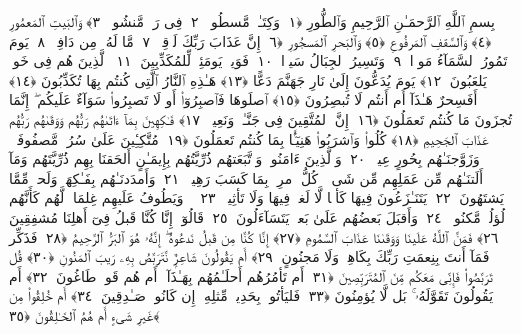 
  
    
  
    
    

\nopagebreak
  بِسمِ ٱللَّهِ ٱلرَّحمَـٰنِ ٱلرَّحِيمِ
  وَٱلطُّورِ ﴿١﴾
 وَكِتَـٰبٍۢ مَّسطُورٍۢ ﴿٢﴾
 فِى رَقٍّۢ مَّنشُورٍۢ ﴿٣﴾
 وَٱلبَيتِ ٱلمَعمُورِ ﴿٤﴾
 وَٱلسَّقفِ ٱلمَرفُوعِ ﴿٥﴾
 وَٱلبَحرِ ٱلمَسجُورِ ﴿٦﴾
 إِنَّ عَذَابَ رَبِّكَ لَوَٟقِعٌۭ ﴿٧﴾
 مَّا لَهُۥ مِن دَافِعٍۢ ﴿٨﴾
 يَومَ تَمُورُ ٱلسَّمَآءُ مَورًۭا ﴿٩﴾
 وَتَسِيرُ ٱلجِبَالُ سَيرًۭا ﴿١٠﴾
 فَوَيلٌۭ يَومَئِذٍۢ لِّلمُكَذِّبِينَ ﴿١١﴾
 ٱلَّذِينَ هُم فِى خَوضٍۢ يَلعَبُونَ ﴿١٢﴾
 يَومَ يُدَعُّونَ إِلَىٰ نَارِ جَهَنَّمَ دَعًّا ﴿١٣﴾
 هَـٰذِهِ ٱلنَّارُ ٱلَّتِى كُنتُم بِهَا تُكَذِّبُونَ ﴿١٤﴾
 أَفَسِحرٌ هَـٰذَآ أَم أَنتُم لَا تُبصِرُونَ ﴿١٥﴾
 ٱصلَوهَا فَٱصبِرُوٓا۟ أَو لَا تَصبِرُوا۟ سَوَآءٌ عَلَيكُم ۖ إِنَّمَا تُجزَونَ مَا كُنتُم تَعمَلُونَ ﴿١٦﴾
 إِنَّ ٱلمُتَّقِينَ فِى جَنَّـٰتٍۢ وَنَعِيمٍۢ ﴿١٧﴾
 فَـٰكِهِينَ بِمَآ ءَاتَىٰهُم رَبُّهُم وَوَقَىٰهُم رَبُّهُم عَذَابَ ٱلجَحِيمِ ﴿١٨﴾
 كُلُوا۟ وَٱشرَبُوا۟ هَنِيٓـًٔۢا بِمَا كُنتُم تَعمَلُونَ ﴿١٩﴾
 مُتَّكِـِٔينَ عَلَىٰ سُرُرٍۢ مَّصفُوفَةٍۢ ۖ وَزَوَّجنَـٰهُم بِحُورٍ عِينٍۢ ﴿٢٠﴾
 وَٱلَّذِينَ ءَامَنُوا۟ وَٱتَّبَعَتهُم ذُرِّيَّتُهُم بِإِيمَـٰنٍ أَلحَقنَا بِهِم ذُرِّيَّتَهُم وَمَآ أَلَتنَـٰهُم مِّن عَمَلِهِم مِّن شَىءٍۢ ۚ كُلُّ ٱمرِئٍۭ بِمَا كَسَبَ رَهِينٌۭ ﴿٢١﴾
 وَأَمدَدنَـٰهُم بِفَـٰكِهَةٍۢ وَلَحمٍۢ مِّمَّا يَشتَهُونَ ﴿٢٢﴾
 يَتَنَـٰزَعُونَ فِيهَا كَأسًۭا لَّا لَغوٌۭ فِيهَا وَلَا تَأثِيمٌۭ ﴿٢٣﴾
 ۞ وَيَطُوفُ عَلَيهِم غِلمَانٌۭ لَّهُم كَأَنَّهُم لُؤلُؤٌۭ مَّكنُونٌۭ ﴿٢٤﴾
 وَأَقبَلَ بَعضُهُم عَلَىٰ بَعضٍۢ يَتَسَآءَلُونَ ﴿٢٥﴾
 قَالُوٓا۟ إِنَّا كُنَّا قَبلُ فِىٓ أَهلِنَا مُشفِقِينَ ﴿٢٦﴾
 فَمَنَّ ٱللَّهُ عَلَينَا وَوَقَىٰنَا عَذَابَ ٱلسَّمُومِ ﴿٢٧﴾
 إِنَّا كُنَّا مِن قَبلُ نَدعُوهُ ۖ إِنَّهُۥ هُوَ ٱلبَرُّ ٱلرَّحِيمُ ﴿٢٨﴾
 فَذَكِّر فَمَآ أَنتَ بِنِعمَتِ رَبِّكَ بِكَاهِنٍۢ وَلَا مَجنُونٍ ﴿٢٩﴾
 أَم يَقُولُونَ شَاعِرٌۭ نَّتَرَبَّصُ بِهِۦ رَيبَ ٱلمَنُونِ ﴿٣٠﴾
 قُل تَرَبَّصُوا۟ فَإِنِّى مَعَكُم مِّنَ ٱلمُتَرَبِّصِينَ ﴿٣١﴾
 أَم تَأمُرُهُم أَحلَـٰمُهُم بِهَـٰذَآ ۚ أَم هُم قَومٌۭ طَاغُونَ ﴿٣٢﴾
 أَم يَقُولُونَ تَقَوَّلَهُۥ ۚ بَل لَّا يُؤمِنُونَ ﴿٣٣﴾
 فَليَأتُوا۟ بِحَدِيثٍۢ مِّثلِهِۦٓ إِن كَانُوا۟ صَـٰدِقِينَ ﴿٣٤﴾
 أَم خُلِقُوا۟ مِن غَيرِ شَىءٍ أَم هُمُ ٱلخَـٰلِقُونَ ﴿٣٥﴾
